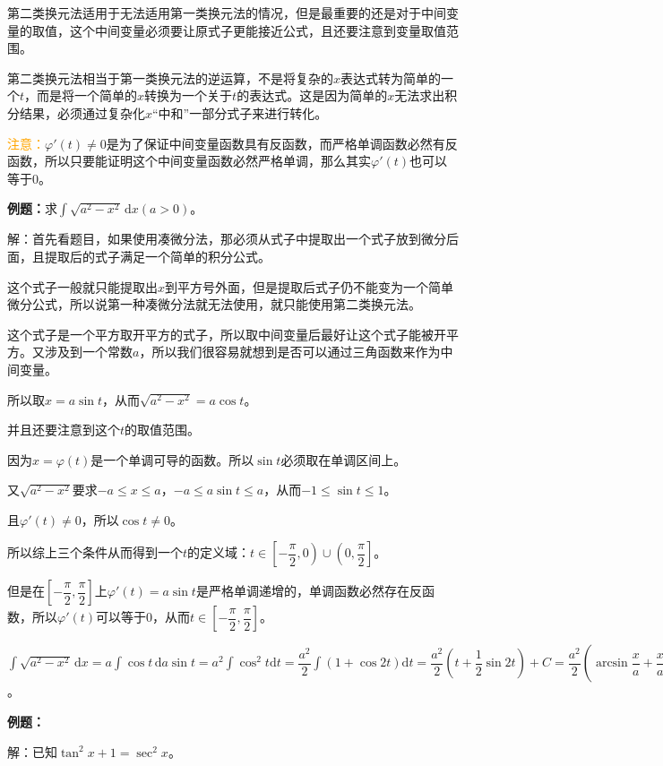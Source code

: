 \documentclass[UTF8, 12pt]{ctexart}
\begin{document}
第二类换元法适用于无法适用第一类换元法的情况，但是最重要的还是对于中间变量的取值，这个中间变量必须要让原式子更能接近公式，且还要注意到变量取值范围。

第二类换元法相当于第一类换元法的逆运算，不是将复杂的$x$表达式转为简单的一个$t$，而是将一个简单的$x$转换为一个关于$t$的表达式。这是因为简单的$x$无法求出积分结果，必须通过复杂化$x$“中和”一部分式子来进行转化。

\textcolor{orange}{注意：}$\varphi'(t)\neq 0$是为了保证中间变量函数具有反函数，而严格单调函数必然有反函数，所以只要能证明这个中间变量函数必然严格单调，那么其实$\varphi'(t)$也可以等于0。

\textbf{例题：}求$\int\sqrt{a^2-x^2}\,\textrm{d}x(a>0)$。

解：首先看题目，如果使用凑微分法，那必须从式子中提取出一个式子放到微分后面，且提取后的式子满足一个简单的积分公式。

这个式子一般就只能提取出$x$到平方号外面，但是提取后式子仍不能变为一个简单微分公式，所以说第一种凑微分法就无法使用，就只能使用第二类换元法。

这个式子是一个平方取开平方的式子，所以取中间变量后最好让这个式子能被开平方。又涉及到一个常数$a$，所以我们很容易就想到是否可以通过三角函数来作为中间变量。

所以取$x=a\sin t$，从而$\sqrt{a^2-x^2}=a\cos t$。

并且还要注意到这个$t$的取值范围。

因为$x=\varphi(t)$是一个单调可导的函数。所以$\sin t$必须取在单调区间上。

又$\sqrt{a^2-x^2}$要求$-a\leqslant x\leqslant a$，$-a\leqslant a\sin t\leqslant a$，从而$-1\leqslant\sin t\leqslant 1$。

且$\varphi'(t)\neq 0$，所以$\cos t\neq 0$。

所以综上三个条件从而得到一个$t$的定义域：$t\in\left[-\dfrac{\pi}{2},0\right)\cup\left(0,\dfrac{\pi}{2}\right]$。

但是在$\left[-\dfrac{\pi}{2},\dfrac{\pi}{2}\right]$上$\varphi'(t)=a\sin t$是严格单调递增的，单调函数必然存在反函数，所以$\varphi'(t)$可以等于0，从而$t\in\left[-\dfrac{\pi}{2},\dfrac{\pi}{2}\right]$。

$\int\sqrt{a^2-x^2}\,\textrm{d}x=a\int\cos t\,\textrm{d}a\sin t=a^2\int\cos^2t\textrm{d}t=\dfrac{a^2}{2}\int(1+\cos 2t)\textrm{d}t=\dfrac{a^2}{2}\left(t+\dfrac{1}{2}\sin 2t\right)+C=\dfrac{a^2}{2}\left(\arcsin\dfrac{x}{a}+\dfrac{x}{a}\sqrt{1-\dfrac{x^2}{a^2}}\right)+C$。

\textbf{例题：}

解：已知$\tan^2x+1=\sec^2x$。
\end{document}
